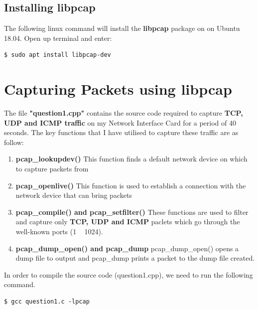 \documentclass[a4paper,11pt]{article}
\begin{document}
\begin{enumerate}
\subsection{Installing libpcap}
The following linux command will install the \textbf{libpcap} package on on Ubuntu 18.04. Open up terminal and enter:
\begin{mdframed}[backgroundcolor=light-gray, roundcorner=30pt,leftmargin=1, rightmargin=1, innerleftmargin=5, innertopmargin=-3,innerbottommargin=5, outerlinewidth=1, linecolor=light-gray]
\begin{lstlisting}
$ sudo apt install libpcap-dev
\end{lstlisting}
\end{mdframed}
\end{enumerate}

\section{Capturing Packets using libpcap}
The file \textbf{"question1.cpp"} contains the source code required to capture \textbf{TCP, UDP and ICMP traffic} on my Network Interface Card for a period of 40 seconds. The key functions that I have utilised to capture these traffic are as follow:
\begin{enumerate}
\item \textbf{pcap\_lookupdev()}
\newline This function finds a default network device on which to capture packets from
\item \textbf{pcap\_openlive()}
\newline This function is used to establish a connection with the network device that can bring packets
\item \textbf{pcap\_compile() and pcap\_setfilter()}
\newline These functions are used to filter and capture only \textbf{TCP, UDP and ICMP} paclets which go through the well-known ports (1 ~ 1024).
\item \textbf{pcap\_dump\_open() and pcap\_dump}
pcap\_dump\_open() opens a dump file to output and pcap\_dump prints a packet to the dump file created.
\end{enumerate}
\noindent 
In order to compile the source code (question1.cpp), we need to run the following command.
\vspace*{-\baselineskip} 
\begin{mdframed}[backgroundcolor=light-gray, roundcorner=30pt,leftmargin=1, rightmargin=1, innerleftmargin=5, innertopmargin=-3,innerbottommargin=5, outerlinewidth=1, linecolor=light-gray]
\begin{lstlisting}
$ gcc question1.c -lpcap
\end{lstlisting}
\end{mdframed}
\end{document}
